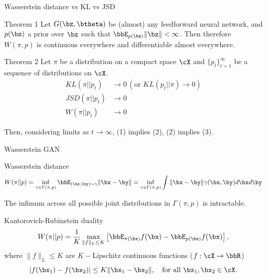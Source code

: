 \begin{frame}{Wasserstein distance vs KL vs JSD}
	\begin{block}{Theorem 1}
		Let $G(\bz, \btheta)$ be (almost) any feedforward neural network, and $p(\bz)$ a prior over $\bz$ such that $\bbE_{p(\bz)} \|\bz\| < \infty$. Then therefore $W(\pi, p)$ is continuous everywhere and differentiable almost everywhere.
	\end{block}
	\begin{block}{Theorem 2}
		Let $\pi$ be a distribution on a compact space $\cX$ and $\{p_t\}_{t=1}^\infty$ be a sequence of distributions on $\cX$. 
		\begin{align}
			KL(\pi || p_t) &\rightarrow 0 \, (\text{or }KL (p_t || \pi) \rightarrow 0) \\
			JSD(\pi || p_t) &\rightarrow 0 \\
			W(\pi || p_t) &\rightarrow 0
		\end{align}
		
		Then, considering limits as $t \rightarrow \infty$, (1) implies (2), (2) implies (3).
	\end{block}
\end{frame}
\begin{frame}{Wasserstein GAN}
	\begin{block}{Wasserstein distance}
		\vspace{-0.4cm}
		\[
			W(\pi || p) = \inf_{\gamma \in \Gamma(\pi, p)} \bbE_{(\bx, \by) \sim \gamma} \| \bx - \by \| =  \inf_{\gamma \in \Gamma(\pi, p)} \int \| \bx - \by \| \gamma (\bx, \by) d \bx d \by
		\]
	\end{block}
	The infimum across all possible joint distributions in $\Gamma(\pi, p)$ is intractable.
	\begin{block}{Kantorovich-Rubinstein duality}
		\[
			W(\pi || p) = \frac{1}{K} \max_{\| f \|_L \leq K} \left[ \bbE_{\pi(\bx)} f(\bx)  - \bbE_{p(\bx)} f(\bx)\right],
		\]
		where $\| f \|_L \leq K$ are $K-$Lipschitz continuous functions ($f: \cX \rightarrow \bbR$)
		\[
			|f(\bx_1) - f(\bx_2)| \leq K \| \bx_1 - \bx_2 \|, \quad \text{for all } \bx_1, \bx_2 \in \cX.
		\]
	\end{block}

\end{frame}
